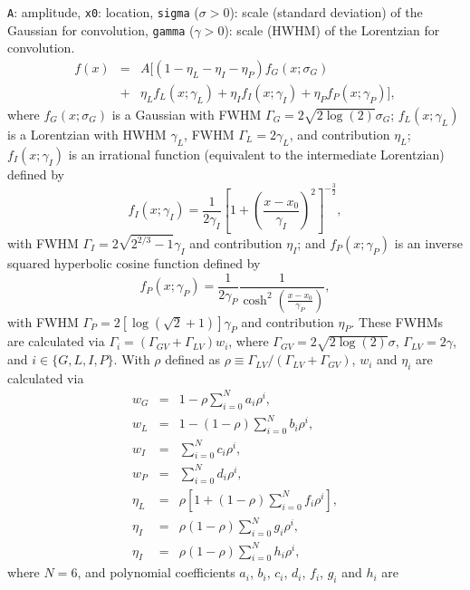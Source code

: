 \documentclass[reprint,showpacs,prb,nofootinbib,amsmath,amssymb]{revtex4-1}
\begin{document}
\begin{enumerate}
\verb|A|: amplitude, \verb|x0|: location, \verb|sigma| ($\sigma>0$): scale (standard deviation) of the Gaussian for convolution, \verb|gamma| ($\gamma>0$): scale (HWHM) of the Lorentzian for convolution.
\begin{eqnarray}
f(x)&=&A[(1-\eta_L-\eta_I-\eta_P) f_G(x;\sigma_G)  \nonumber \\
&+& \eta_L f_L(x;\gamma_L) + \eta_I f_I(x;\gamma_I) + \eta_P f_P(x;\gamma_P)], \nonumber
\end{eqnarray}
where $f_G(x;\sigma_G)$ is a Gaussian with FWHM $\Gamma_G=2\sqrt{2\log(2)}\sigma_G$; $f_L(x;\gamma_L)$ is a Lorentzian with HWHM $\gamma_L$, FWHM $\Gamma_L=2\gamma_L$, and contribution $\eta_L$; $f_I(x;\gamma_I)$ is an irrational function (equivalent to the intermediate Lorentzian) defined by
\begin{equation}
f_I(x;\gamma_I)=\frac{1}{2\gamma_I}\left[1+\left(\frac{x-x_0}{\gamma_I}\right)^2\right]^{-\frac{3}{2}},\nonumber
\end{equation}
with FWHM $\Gamma_I=2\sqrt{2^{2/3}-1}\gamma_I$ and contribution $\eta_I$; and $f_P(x;\gamma_P)$ is an inverse squared hyperbolic cosine function defined by
\begin{equation}
f_P(x;\gamma_P)=\frac{1}{2\gamma_P}\frac{1}{\cosh^2\left(\frac{x-x_0}{\gamma_P}\right)},\nonumber
\end{equation}
with FWHM $\Gamma_P=2\left[\log(\sqrt{2}+1)\right]\gamma_P$ and contribution $\eta_P$. These FWHMs are calculated via $\Gamma_i=(\Gamma_{GV}+\Gamma_{LV})w_i$, where $\Gamma_{GV}=2\sqrt{2\log(2)}\sigma$,  $\Gamma_{LV}=2\gamma$, and $i\in \{G,L,I,P\}$. With $\rho$ defined as $\rho\equiv\Gamma_{LV}/(\Gamma_{LV}+\Gamma_{GV})$, $w_i$ and $\eta_i$ are calculated via
\begin{eqnarray}
w_G&=&1-\rho\sum_{i=0}^{N}a_i\rho^i,\nonumber\\
w_L&=&1-(1-\rho)\sum_{i=0}^{N}b_i\rho^i,\nonumber\\
w_I&=&\sum_{i=0}^{N}c_i\rho^i,\nonumber\\
w_P&=&\sum_{i=0}^{N}d_i\rho^i,\nonumber\\
\eta_L&=&\rho\left[1+(1-\rho)\sum_{i=0}^{N}f_i\rho^i\right],\nonumber\\
\eta_I&=&\rho(1-\rho)\sum_{i=0}^{N}g_i\rho^i,\nonumber\\
\eta_I&=&\rho(1-\rho)\sum_{i=0}^{N}h_i\rho^i,\nonumber
\end{eqnarray}
where $N=6$, and polynomial coefficients $a_i$, $b_i$, $c_i$, $d_i$, $f_i$, $g_i$ and $h_i$ are
\begin{widetext}

\end{widetext}
\end{enumerate}
\end{document}

